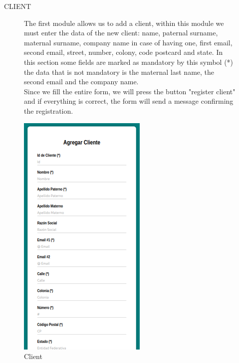 \documentclass{article}
\begin{document}
\begin{center}
CLIENT
\end{center}
\begin{figure}[ht]
\begin{minipage}[t]{0.5\linewidth}
\bigskip
\bigskip
\bigskip
\bigskip
\bigskip
\bigskip

The first module allows us to add a client, within this module we must enter the data of the new client: name, paternal surname, maternal surname, company name in case of having one, first email, second email, street, number, colony, code postcard and state. In this section some fields are marked as mandatory by this symbol (*) the data that is not mandatory is the maternal last name, the second email and the company name.\\

Since we fill the entire form, we will press the button "register client" and if everything is correct, the form will send a message confirming the registration.\\
\end{minipage}
\begin{minipage}[t]{0.5\linewidth}
\caption {Client}
\centering
\includegraphics[scale=1]{fig5}
\end{minipage}
\end{figure}

\pagebreak
\end{document}
